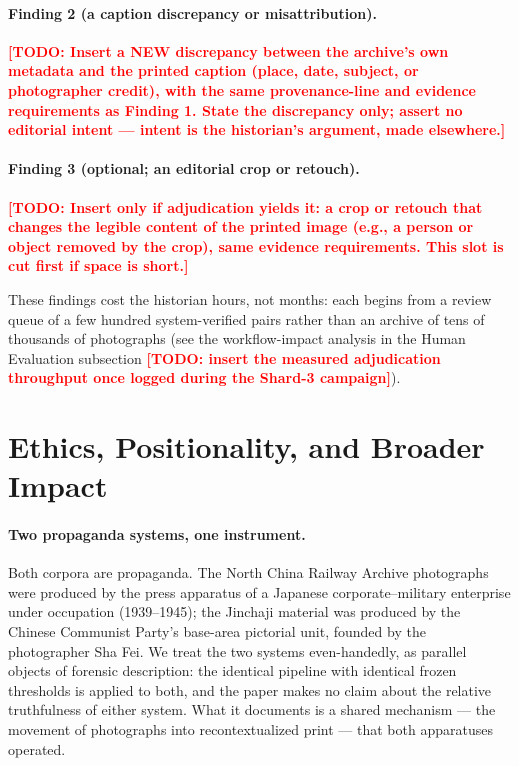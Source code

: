 \documentclass[letterpaper]{article} %
\newcommand{\todo}[1]{\textcolor{red}{\textbf{[TODO: #1]}}}
\begin{document}
\paragraph{Finding 2 (a caption discrepancy or misattribution).}
\todo{Insert a NEW discrepancy between the archive's own metadata and
the printed caption (place, date, subject, or photographer credit),
with the same provenance-line and evidence requirements as Finding 1.
State the discrepancy only; assert no editorial intent --- intent is
the historian's argument, made elsewhere.}

\paragraph{Finding 3 (optional; an editorial crop or retouch).}
\todo{Insert only if adjudication yields it: a crop or retouch that
changes the legible content of the printed image (e.g., a person or
object removed by the crop), same evidence requirements. This slot is
cut first if space is short.}

These findings cost the historian hours, not months: each begins from a
review queue of a few hundred system-verified pairs rather than an
archive of tens of thousands of photographs (see the workflow-impact
analysis in the Human Evaluation subsection \todo{insert the measured
adjudication throughput once logged during the Shard-3 campaign}).

\section{Ethics, Positionality, and Broader Impact}
\label{sec:ethics}

\paragraph{Two propaganda systems, one instrument.}
Both corpora are propaganda. The North China Railway Archive
photographs were produced by the press apparatus of a Japanese
corporate--military enterprise under occupation (1939--1945); the
Jinchaji material was produced by the Chinese Communist Party's
base-area pictorial unit, founded by the photographer Sha Fei. We
treat the two systems even-handedly, as parallel objects of forensic
description: the identical pipeline with identical frozen thresholds
is applied to both, and the paper makes no claim about the relative
truthfulness of either system. What it documents is a shared
mechanism --- the movement of photographs into recontextualized
print --- that both apparatuses operated.
\end{document}
